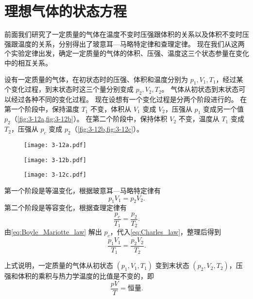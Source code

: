 \section{理想气体的状态方程}
前面我们研究了一定质量的气体在温度不变时压强跟体积的关系以及体积不变时压强跟温度的关系，分别得出了玻意耳—马略特定律和查理定律。
现在我们从这两个实验定律出发，确定一定质量的气体的体积、压强、温度这三个状态参量在变化中的相互关系。

设有一定质量的气体，在初状态时的压强、体积和温度分别为 $p_1,V_1,T_1$，经过某个变化过程，到末状态时这三个量分别变成 $p_2,V_2,T_2$。
气体从初状态到末状态可以经过各种不同的变化过程。
现在设想有一个变化过程是分两个阶段进行的。
在第一个阶段中，保持温度 $T_1$ 不变，体积从 $V_1$ 变成 $V_2$，压强从 $p_1$ 变成另一个值 $p_2$（\cref{fig:3-12a,fig:3-12b}）。
在第二个阶段中，保持体积 $V_2$ 不变，温度从 $T_1$ 变成 $T_2$，压强从 $p_c$ 变成 $p_2$（\cref{fig:3-12b,fig:3-12c}）。

\begin{figure}
	\begin{minipage}{0.25\linewidth}\centering
		\texttt{[image: 3-12a.pdf]}
		\subcaption{}\label{fig:3-12a}
	\end{minipage}\ce{->[\text{等温}]}
	\begin{minipage}{0.25\linewidth}\centering
		\texttt{[image: 3-12b.pdf]}
		\subcaption{}\label{fig:3-12b}
	\end{minipage}\ce{->[\text{等容}]}
	\begin{minipage}{0.25\linewidth}\centering
		\texttt{[image: 3-12c.pdf]}
	  \subcaption{}\label{fig:3-12c}
	\end{minipage}
	\caption{}\label{fig:3-12}
\end{figure}

第一个阶段是等温变化，根据玻意耳—马略特定律有
\begin{equation}
	\label{eq:Boyle_Mariotte_law}
p_1V_1=p_2V_2.
\end{equation}
第二个阶段是等容变化，根据查理定律有
\begin{equation}
	\label{eq:Charles_law}
\frac{p_c}{T_1}=\frac{p_2}{T_2}.
\end{equation}
由\cref{eq:Boyle_Mariotte_law} 解出 $p_c$，代入\cref{eq:Charles_law}，整理后得到
\begin{equation}
	\label{eq:Gay_Lussac_law}
\frac{p_1V_1}{T_1}=\frac{p_2V_2}{T_2}.
\end{equation}

上式说明，一定质量的气体从初状态 $(p_1,V_1,T_1)$ 变到末状态 $(p_2,V_2,T_2)$，压强和体积的乘积与热力学温度的比值是不变的，即
\begin{equation}
	\label{eq:PVnRT}
\frac{pV}{T}=\text{恒量}.
\end{equation}

